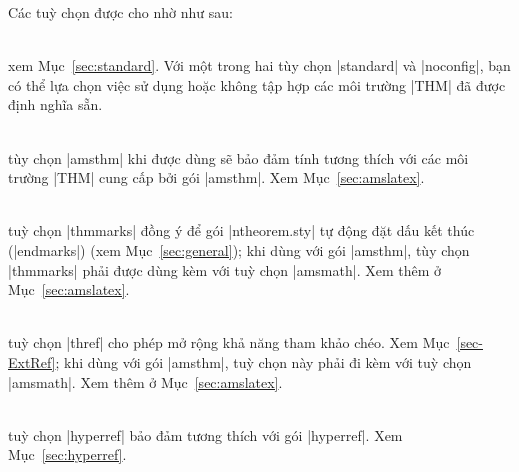\medskip
Các tuỳ chọn được cho nhờ  như sau: %
\begin{description}
\item{} \\
	xem Mục~\vref{sec:standard}. Với một
	trong hai tùy chọn |standard| và |noconfig|,
	bạn có thể lựa chọn việc sử dụng hoặc không tập hợp
	các môi trường |THM| đã được định nghĩa sẵn.
\item{}\\
	tùy chọn |amsthm| khi được dùng sẽ bảo đảm tính tương thích với các môi trường
	|THM| cung cấp bởi gói |amsthm|. Xem Mục~\vref{sec:amslatex}.
\item{}\\
	tuỳ chọn |thmmarks| đồng ý để gói |ntheorem.sty| tự động đặt dấu kết thúc
	(|endmarks|) (xem Mục~\ref{sec:general}); khi dùng với gói |amsthm|,
	tùy chọn |thmmarks| phải được dùng kèm với tuỳ chọn |amsmath|.
	Xem thêm ở Mục~\ref{sec:amslatex}.
\item{}\\
	tuỳ chọn |thref| cho phép mở rộng khả năng tham khảo chéo. Xem Mục~\vref{sec-ExtRef};
	khi dùng với gói |amsthm|, tuỳ chọn này phải đi kèm với tuỳ chọn |amsmath|.
	Xem thêm ở Mục~\ref{sec:amslatex}.
\item{}\\
	tuỳ chọn |hyperref| bảo đảm tương thích với gói |hyperref|.
	Xem Mục~\vref{sec:hyperref}.
\end{description}

